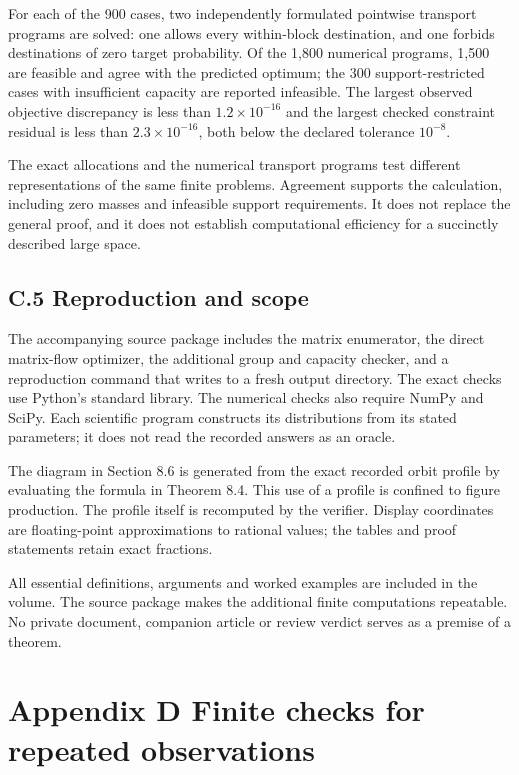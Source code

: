 \documentclass[
]{article}
\begin{document}
For each of the 900 cases, two independently formulated pointwise
transport programs are solved: one allows every within-block
destination, and one forbids destinations of zero target probability. Of
the 1,800 numerical programs, 1,500 are feasible and agree with the
predicted optimum; the 300 support-restricted cases with insufficient
capacity are reported infeasible. The largest observed objective
discrepancy is less than \(1.2\times10^{-16}\) and the largest checked
constraint residual is less than \(2.3\times10^{-16}\), both below the
declared tolerance \(10^{-8}\).

The exact allocations and the numerical transport programs test
different representations of the same finite problems. Agreement
supports the calculation, including zero masses and infeasible support
requirements. It does not replace the general proof, and it does not
establish computational efficiency for a succinctly described large
space.

\subsection{C.5 Reproduction and
scope}\label{c.5-reproduction-and-scope}

The accompanying source package includes the matrix enumerator, the
direct matrix-flow optimizer, the additional group and capacity checker,
and a reproduction command that writes to a fresh output directory. The
exact checks use Python's standard library. The numerical checks also
require NumPy and SciPy. Each scientific program constructs its
distributions from its stated parameters; it does not read the recorded
answers as an oracle.

The diagram in Section 8.6 is generated from the exact recorded orbit
profile by evaluating the formula in Theorem 8.4. This use of a profile
is confined to figure production. The profile itself is recomputed by
the verifier. Display coordinates are floating-point approximations to
rational values; the tables and proof statements retain exact fractions.

All essential definitions, arguments and worked examples are included in
the volume. The source package makes the additional finite computations
repeatable. No private document, companion article or review verdict
serves as a premise of a theorem.

\section{Appendix D Finite checks for repeated
observations}\label{appendix-d-finite-checks-for-repeated-observations}
\end{document}
